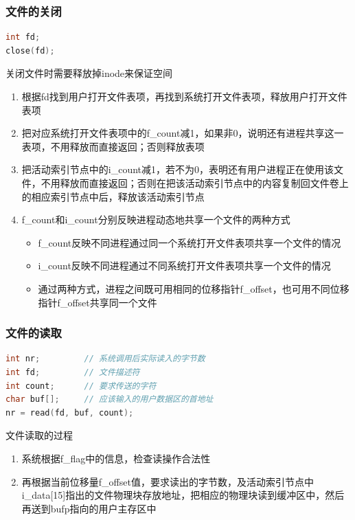 \documentclass[cs4size,a4paper,10pt]{ctexart}
\begin{document}
	\subsubsection{文件的关闭}
	\begin{lstlisting}[language=C,keywordstyle=\color{black}]
int fd;
close(fd);		
	\end{lstlisting}

	关闭文件时需要释放掉inode来保证空间
	\begin{enumerate}[label=\arabic*.]
		\item 根据fd找到用户打开文件表项，再找到系统打开文件表项，释放用户打开文件表项
		\item 把对应系统打开文件表项中的f\_count减1，如果非0，说明还有进程共享这一表项，不用释放而直接返回；否则释放表项
		\item 把活动索引节点中的i\_count减1，若不为0，表明还有用户进程正在使用该文件，不用释放而直接返回；否则在把该活动索引节点中的内容复制回文件卷上的相应索引节点中后，释放该活动索引节点
		\item f\_count和i\_count分别反映进程动态地共享一个文件的两种方式
		\begin{itemize}
			\item f\_count反映不同进程通过同一个系统打开文件表项共享一个文件的情况
			\item i\_count反映不同进程通过不同系统打开文件表项共享一个文件的情况
			\item 通过两种方式，进程之间既可用相同的位移指针f\_offset，也可用不同位移指针f\_offset共享同一个文件
		\end{itemize}
	\end{enumerate}

	\subsubsection{文件的读取}
	\begin{lstlisting}[language=C,keywordstyle=\color{black}]
int nr;    	 	// 系统调用后实际读入的字节数
int fd;     	// 文件描述符
int count;  	// 要求传送的字符
char buf[]; 	// 应该输入的用户数据区的首地址
nr = read(fd, buf, count);	
	\end{lstlisting}

	文件读取的过程
	\begin{enumerate}[label=\arabic*.]
		\item 系统根据f\_flag中的信息，检查读操作合法性
		\item 再根据当前位移量f\_offset值，要求读出的字节数，及活动索引节点中i\_data[15]指出的文件物理块存放地址，把相应的物理块读到缓冲区中，然后 再送到bufp指向的用户主存区中
	\end{enumerate}
\end{document}
